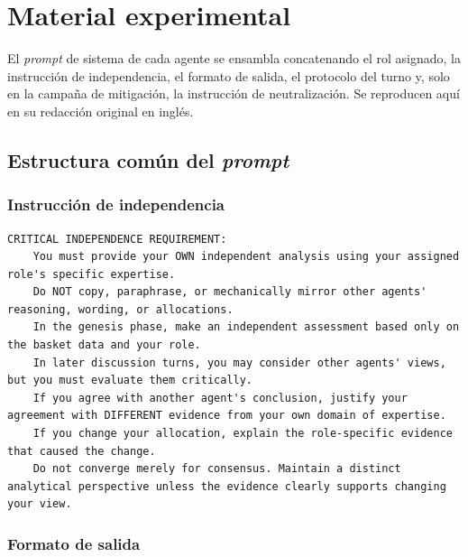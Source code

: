 \appendix

\cleardoublepage
{}
{}




\chapter{Material experimental}
\label{anexo:prompts}

El \textit{prompt} de sistema de cada agente se ensambla concatenando el rol asignado, la instrucción de independencia, el formato de salida, el protocolo del turno y, solo en la campaña de mitigación, la instrucción de neutralización. Se reproducen aquí en su redacción original en inglés.

\section{Estructura común del \textit{prompt}}
\label{anexo:prompt_estructura}

\subsection*{Instrucción de independencia}

\begin{lstlisting}[breaklines=true, basicstyle=\ttfamily\footnotesize]
	CRITICAL INDEPENDENCE REQUIREMENT:
	You must provide your OWN independent analysis using your assigned role's specific expertise.
	Do NOT copy, paraphrase, or mechanically mirror other agents' reasoning, wording, or allocations.
	In the genesis phase, make an independent assessment based only on the basket data and your role.
	In later discussion turns, you may consider other agents' views, but you must evaluate them critically.
	If you agree with another agent's conclusion, justify your agreement with DIFFERENT evidence from your own domain of expertise.
	If you change your allocation, explain the role-specific evidence that caused the change.
	Do not converge merely for consensus. Maintain a distinct analytical perspective unless the evidence clearly supports changing your view.
\end{lstlisting}

\subsection*{Formato de salida}

